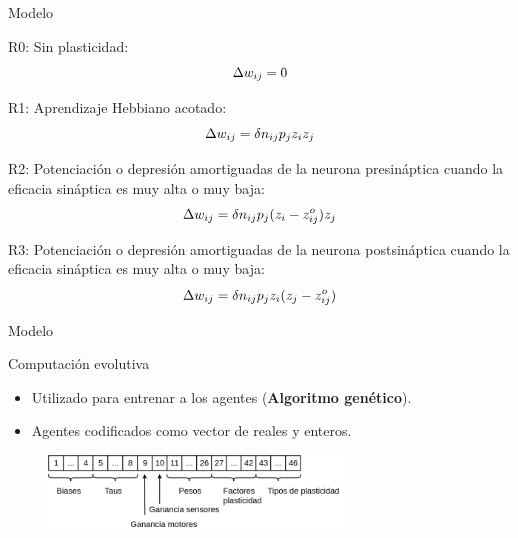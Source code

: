 \documentclass[aspectratio=169]{beamer}
\begin{document}
\begin{frame}{Modelo}

R0: Sin plasticidad:
\begin{equation*}
 \centering
 \Delta w_{ij}= 0
\end{equation*}

R1: Aprendizaje Hebbiano acotado:
\begin{equation*}
 \centering
 \Delta w_{ij}= \delta n_{ij} p_{j} z_{i} z_{j}
\end{equation*}

R2: Potenciación o depresión amortiguadas de la neurona presináptica cuando la eficacia sináptica es muy alta o muy baja:
\begin{equation*}
 \centering
 \Delta w_{ij}= \delta n_{ij} p_{j} (z_{i} - z_{ij}^{o}) z_{j}
\end{equation*}

R3: Potenciación o depresión amortiguadas de la neurona postsináptica cuando la eficacia sináptica es muy alta o muy baja:
\begin{equation*}
 \centering
 \Delta w_{ij}= \delta n_{ij} p_{j} z_{i} (z_{j} - z_{ij}^{o})
\end{equation*}
\end{frame}

\begin{frame}{Modelo}
\begin{block}{Computación evolutiva}
  \begin{itemize}
    \item Utilizado para entrenar a los agentes (\textbf{Algoritmo genético}).
    \item Agentes codificados como vector de reales y enteros.
  \end{itemize}
  \begin{figure}
    \centering
  \includegraphics[width=0.7\textwidth,height=.3\textheight]{Imagenes/vector0}
\end{figure}
\end{block}
\end{frame}
\end{document}
